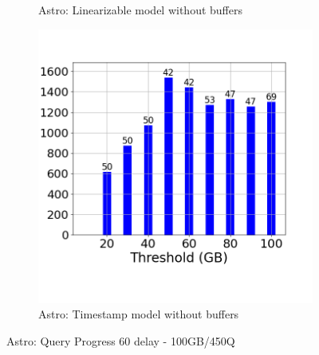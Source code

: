 \begin{figure}
\begin{subfigure}[c]{0.48\textwidth}
		\caption{Astro: Linearizable model without buffers}
		\label{fig:logical-ts-no-60-astro}
	\end{subfigure}
	\begin{subfigure}[c]{0.48\textwidth}
		\includegraphics[width=1\textwidth]	 {figures/Experiments/Dynamic/ASTRO/Batch_processing/60/average_query_time_per_batch_version_999777017_10485760_10_delay[60].png}
		\caption{Astro: Timestamp model without buffers}
		\label{fig:system-ts-no-60-astro}
	\end{subfigure}
	\caption{Astro: Query Progress 60 delay - 100GB/450Q}
	\label{fig:query-progress-60-astro}
\end{figure}
